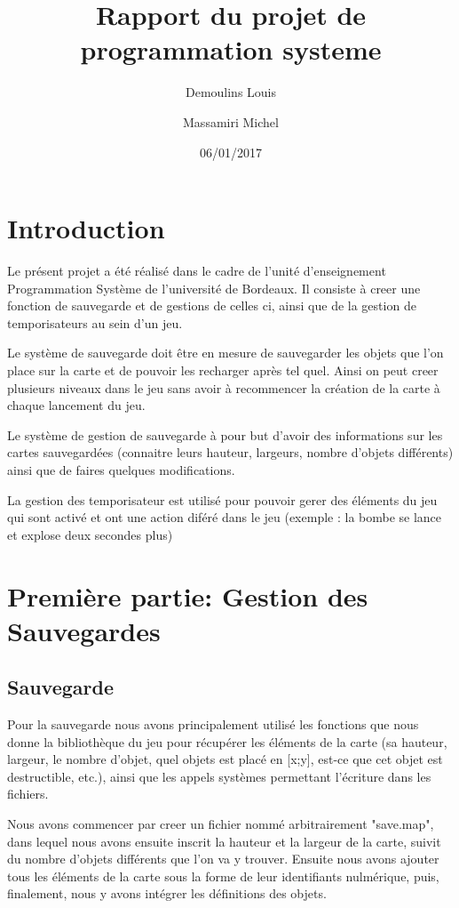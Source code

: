 \documentclass{article}
\title{Rapport du projet de programmation systeme}
\date{06/01/2017}
\author{Demoulins Louis \and Massamiri Michel}
\begin{document}
\maketitle


\newpage
\section{Introduction}

Le présent projet a été réalisé dans le cadre de l'unité d'enseignement Programmation Système de l'université de Bordeaux. Il consiste à creer une fonction de sauvegarde et de gestions de celles ci, ainsi que de la gestion de temporisateurs au sein d'un jeu.

Le système de sauvegarde doit être en mesure de sauvegarder les objets que l'on place sur la carte et de pouvoir les recharger après tel quel. Ainsi on peut creer plusieurs niveaux dans le jeu sans avoir à recommencer la création de la carte à chaque lancement du jeu.

Le système de gestion de sauvegarde à pour but d'avoir des informations sur les cartes sauvegardées (connaitre leurs hauteur, largeurs, nombre d'objets différents) ainsi que de faires quelques modifications.

La gestion des temporisateur est utilisé pour pouvoir gerer des éléments du jeu qui sont activé et ont une action diféré dans le jeu (exemple : la bombe se lance et explose deux secondes plus)

\newpage
\section{Première partie: Gestion des Sauvegardes}

\subsection{Sauvegarde}
Pour la sauvegarde nous avons principalement utilisé les fonctions que nous donne la bibliothèque du jeu pour récupérer les éléments de la carte (sa hauteur, largeur, le nombre d'objet, quel objets est placé en [x;y], est-ce que cet objet est destructible, etc.), ainsi que les appels systèmes permettant l'écriture dans les fichiers. 

Nous avons commencer par creer un fichier nommé arbitrairement "save.map", dans lequel nous avons ensuite inscrit la hauteur et la largeur de la carte, suivit du nombre d'objets différents que l'on va y trouver. Ensuite nous avons ajouter tous les éléments de la carte sous la forme de leur identifiants nulmérique, puis, finalement, nous y avons intégrer les définitions des objets.
\end{document}

